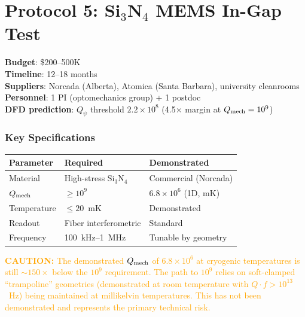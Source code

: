 \documentclass[11pt]{article}
\newcommand{\ee}[1]{\times 10^{#1}}
\newcommand{\Qpsi}{Q_\psi}
\newcommand{\caution}[1]{\textcolor{orange}{\textbf{CAUTION:} #1}}
\begin{document}
\part{Protocol 5: Si$_3$N$_4$ MEMS In-Gap Test}
\label{part:mems}

\begin{tcolorbox}[colback=blue!3!white, colframe=proposalcolor,
  title=\textbf{PROTOCOL 5: MEMS IN-GAP $\Qpsi$ THRESHOLD TEST}]
\textbf{Budget}: \$200--500K\\
\textbf{Timeline}: 12--18 months\\
\textbf{Suppliers}: Norcada (Alberta), Atomica (Santa Barbara),
  university cleanrooms\\
\textbf{Personnel}: 1 PI (optomechanics group) + 1 postdoc\\
\textbf{DFD prediction}: $\Qpsi$ threshold $2.2\ee{8}$ (4.5$\times$
  margin at $Q_{\rm mech} = 10^9$)
\end{tcolorbox}

\section{Key Specifications}

\begin{center}
\renewcommand{\arraystretch}{1.2}
\begin{tabular}{@{}lll@{}}
\toprule
\textbf{Parameter} & \textbf{Required} & \textbf{Demonstrated} \\
\midrule
Material & High-stress Si$_3$N$_4$ & Commercial (Norcada) \\
$Q_{\rm mech}$ & $\geq 10^9$ & $6.8\ee{6}$ (1D, mK) \\
Temperature & $\leq 20$~mK & Demonstrated \\
Readout & Fiber interferometric & Standard \\
Frequency & 100~kHz--1~MHz & Tunable by geometry \\
\bottomrule
\end{tabular}
\end{center}

\caution{The demonstrated $Q_{\rm mech}$ of $6.8\ee{6}$ at cryogenic
temperatures is still $\sim 150\times$ below the $10^9$ requirement.
The path to $10^9$ relies on soft-clamped ``trampoline'' geometries
(demonstrated at room temperature with $Q \cdot f > 10^{13}$~Hz) being
maintained at millikelvin temperatures. This has not been demonstrated
and represents the primary technical risk.}
\end{document}
